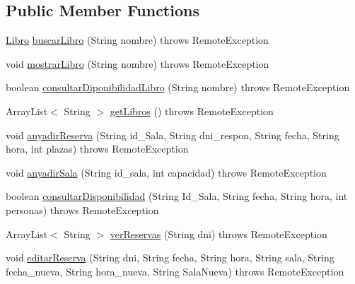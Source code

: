 \subsection*{Public Member Functions}
\begin{DoxyCompactItemize}
\item 
\mbox{\hyperlink{classes_1_1deusto_1_1spq_1_1biblioteca_1_1data_1_1_libro}{Libro}} \mbox{\hyperlink{interfacees_1_1deusto_1_1spq_1_1biblioteca_1_1remote_1_1_i_biblioteca_a29a3d22f9c3f8b84604eec2ab9955dfe}{buscar\+Libro}} (String nombre)  throws Remote\+Exception
\item 
void \mbox{\hyperlink{interfacees_1_1deusto_1_1spq_1_1biblioteca_1_1remote_1_1_i_biblioteca_a9a4d21325f41bc582e7e792e0ae40857}{mostrar\+Libro}} (String nombre)  throws Remote\+Exception
\item 
boolean \mbox{\hyperlink{interfacees_1_1deusto_1_1spq_1_1biblioteca_1_1remote_1_1_i_biblioteca_ae8795f9243cf23bff712d636c182193d}{consultar\+Diponibilidad\+Libro}} (String nombre)  throws Remote\+Exception
\item 
Array\+List$<$ String $>$ \mbox{\hyperlink{interfacees_1_1deusto_1_1spq_1_1biblioteca_1_1remote_1_1_i_biblioteca_a84e7d607d76ccc999d384d967987ebd8}{get\+Libros}} ()  throws Remote\+Exception
\item 
void \mbox{\hyperlink{interfacees_1_1deusto_1_1spq_1_1biblioteca_1_1remote_1_1_i_biblioteca_a4d0efe1c5a592db92d9b416f59ac8d9a}{anyadir\+Reserva}} (String id\+\_\+\+Sala, String dni\+\_\+respon, String fecha, String hora, int plazas)  throws Remote\+Exception
\item 
void \mbox{\hyperlink{interfacees_1_1deusto_1_1spq_1_1biblioteca_1_1remote_1_1_i_biblioteca_a3f32377ccce2450ce8154902b470bf5b}{anyadir\+Sala}} (String id\+\_\+sala, int capacidad)  throws Remote\+Exception
\item 
boolean \mbox{\hyperlink{interfacees_1_1deusto_1_1spq_1_1biblioteca_1_1remote_1_1_i_biblioteca_a96a133c2557486013949667cf0a14118}{consultar\+Disponibilidad}} (String Id\+\_\+\+Sala, String fecha, String hora, int personas)  throws Remote\+Exception
\item 
Array\+List$<$ String $>$ \mbox{\hyperlink{interfacees_1_1deusto_1_1spq_1_1biblioteca_1_1remote_1_1_i_biblioteca_a9ad945750f5db60c869a696e276f7421}{ver\+Reservas}} (String dni)  throws Remote\+Exception
\item 
void \mbox{\hyperlink{interfacees_1_1deusto_1_1spq_1_1biblioteca_1_1remote_1_1_i_biblioteca_aa7df9834f70a04eaa4ce64e30bce0ede}{editar\+Reserva}} (String dni, String fecha, String hora, String sala, String fecha\+\_\+nueva, String hora\+\_\+nueva, String Sala\+Nueva)  throws Remote\+Exception

\end{DoxyCompactItemize}
